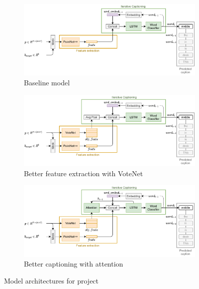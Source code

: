 \documentclass[10pt,twocolumn,letterpaper]{article}
\begin{document}
\begin{figure}
	\begin{subfigure}[c]{\textwidth}
		\centering
		\includegraphics[width=\textwidth]{figures/arch_baseline.pdf}
		\caption{Baseline model}
		\label{fig:baseline}
	\end{subfigure}
	\begin{subfigure}[c]{\textwidth}
		\centering
		\includegraphics[width=\textwidth]{figures/arch_votenet.pdf}
		\caption{Better feature extraction with VoteNet}
		\label{fig:votenet}
	\end{subfigure}
	\begin{subfigure}[c]{\textwidth}
		\centering
		\includegraphics[width=\textwidth]{figures/arch_attention.pdf}
		\caption{Better captioning with attention}
		\label{fig:attention}
	\end{subfigure}
	\caption{Model architectures for project}
	\label{fig:architectures}
\end{figure}
\end{document}
